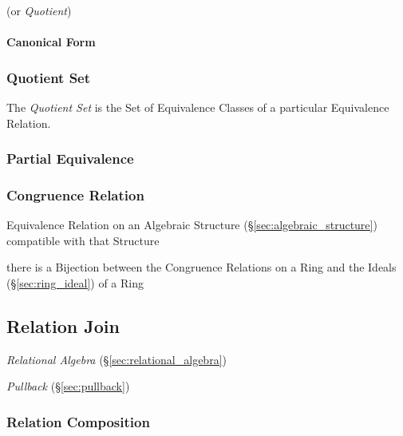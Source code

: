 (or \emph{Quotient})



\paragraph{Canonical Form}\label{sec:canonical_form}\hfill



\subsubsection{Quotient Set}\label{sec:quotient_set}

The \emph{Quotient Set} is the Set of Equivalence Classes of a
particular Equivalence Relation.



\subsubsection{Partial Equivalence}\label{sec:partial_equivalence}

\subsubsection{Congruence Relation}\label{sec:congruence_relation}

Equivalence Relation on an Algebraic Structure
(\S\ref{sec:algebraic_structure}) compatible with that Structure

there is a Bijection between the Congruence Relations on a Ring and the Ideals
(\S\ref{sec:ring_ideal}) of a Ring



\subsection{Relation Join}\label{sec:relation_join}

\emph{Relational Algebra} (\S\ref{sec:relational_algebra})

\emph{Pullback} (\S\ref{sec:pullback})



\subsubsection{Relation Composition}\label{sec:relation_composition}

